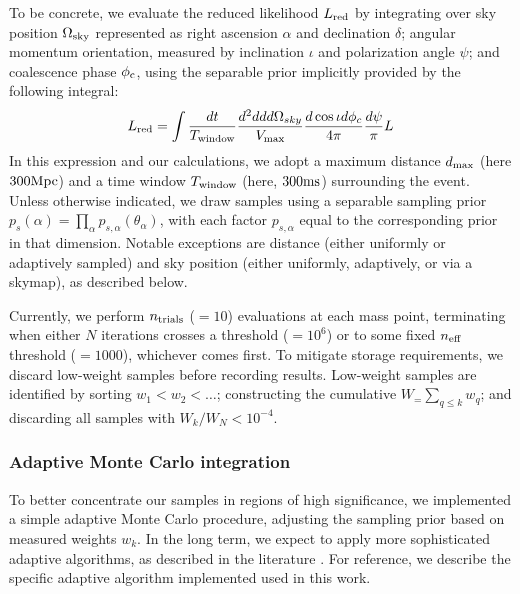 \documentclass[twocolumn,prd,nofootinbib]{revtex4}
\newcommand\unit[1]{{\rm #1}}
\begin{document}
To be concrete, we evaluate the reduced likelihood $L_{\rm red}$ by integrating over sky position $\Omega_{\rm sky}$ represented
as right ascension $\alpha$ and declination $\delta$; angular momentum orientation, measured by inclination $\iota$ and
polarization angle $\psi$;  and coalescence phase $\phi_{\rm c}$, using the separable prior implicitly provided by the
following integral:
\begin{eqnarray}
L_{\rm red} = \int \frac{dt}{T_{\rm window}} \frac{d^2 dd d\Omega_{sky} }{V_{\rm max}} \frac{d \cos \iota d\phi_c}{4\pi} \frac{d\psi}{\pi} L
\end{eqnarray}
%
In this expression and our calculations, we adopt a maximum distance $d_{\rm max}$ (here $300 \unit{Mpc}$) and a time window
$ T_{\rm window}$  (here, $300\unit{ms}$)  surrounding the event.  
%
Unless otherwise indicated, we draw samples using a separable sampling prior $p_s(\alpha) =
\prod_{\alpha}p_{s,\alpha}(\theta_\alpha)$, with each factor $p_{s,\alpha}$ equal to the corresponding prior in that dimension.  Notable exceptions are
distance (either uniformly or adaptively sampled) and sky position (either uniformly, adaptively, or via a skymap), as
described below.
%

Currently, we perform $n_{\rm trials}$ ($=10$) evaluations at each mass point, terminating when either $N$ iterations
crosses a threshold ($=10^6$) or to some fixed
$n_{\rm eff}$ threshold ($=1000$), whichever comes first.  
To mitigate storage requirements, we discard  low-weight samples before recording results.  Low-weight samples are identified by sorting  $w_1<w_2<\ldots$;
constructing the cumulative $W_=\sum_{q\le k} w_q$; and discarding all samples with $W_k/W_N<10^{-4}$.  

\subsubsection{Adaptive Monte Carlo integration}

To better concentrate our samples in regions of high significance, we implemented a simple adaptive Monte Carlo procedure, adjusting
the sampling prior based on measured weights $w_k$.   In the long term, we expect to apply more sophisticated adaptive
algorithms, as described in the literature \cite{book-mm-NumericalRecipies,peter1978new}.  For reference, we describe
the specific adaptive algorithm implemented used in this work.
\end{document}
